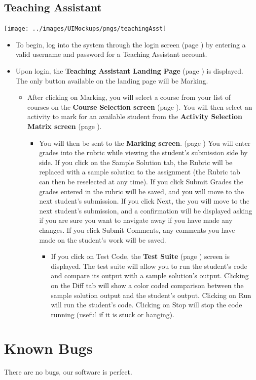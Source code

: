 \documentclass{article}
\begin{document}
\subsection{Teaching Assistant}
\centerline{\texttt{[image: ../images/UIMockups/pngs/teachingAsst]}}
\begin{itemize}
  \item To begin, log into the system through the login screen (page \pageref{login})
    by entering a valid username and password for a Teaching Assistant account.
  \item Upon login, the \textbf{Teaching Assistant Landing Page} (page \pageref{landPg}) 
  	is displayed. The only button available on the landing page will be Marking.
    \begin{itemize}
      \item After clicking on Marking, you will select a course from your list of courses
	on the \textbf{Course Selection screen} (page \pageref{courseSel}). You will then select an activity
	to mark for an available student from the \textbf{Activity Selection Matrix
	  screen} (page \pageref{actSel}).
	\begin{itemize}
	  \item You will then be sent to the \textbf{Marking screen}. (page
	    \pageref{marking}) You will enter grades into the rubric while viewing 
	    the student's submission side by side. If you click on the Sample Solution 
	    tab, the Rubric will be replaced with a sample solution to the assignment 
	    (the Rubric tab can then be reselected at any time). If you click Submit 
	    Grades the grades entered in the rubric will be saved, and you will 
	    move to the next student's submission. If you click Next, the you will 
	    move to the next student's submission, and a confirmation will be displayed 
	    asking if you are sure you want to navigate away if you have made any 
	    changes. If you click Submit Comments, any comments you have made 
	    on the student's work will be saved.
	    \begin{itemize}
	      \item If you click on Test Code, the \textbf{Test Suite} (page 
		\pageref{testSuite}) screen is displayed. The test suite will allow you 
		to run the student's code and compare its output with a sample 
		solution's output. Clicking on the Diff tab will show a color coded 
		comparison between the sample solution output and the student's 
		output. Clicking on Run will run the student's code. Clicking on Stop 
		will stop the code running (useful if it is stuck or hanging).
	    \end{itemize}
	\end{itemize}
    \end{itemize}
\end{itemize}

\section{Known Bugs}
There are no bugs, our software is perfect.
\end{document}
